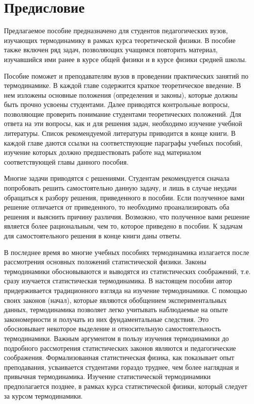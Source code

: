 
\chapter*{Предисловие}

Предлагаемое пособие предназначено для студентов педагогических вузов,
изучающих термодинамику в рамках курса теоретической физики. В пособие
также включен ряд задач, позволяющих учащимся повторить материал,
изучавшийся ими ранее в курсе общей физики и в курсе физики средней
школы.

Пособие поможет и преподавателям вузов в проведении практических занятий
по термодинамике. В каждой главе содержится краткое теоретическое
введение. В нем изложены основные положения (определения и законы),
которые должны быть прочно усвоены студентами. Далее приводятся
контрольные вопросы, позволяющие проверить понимание студентами
теоретических положений. Для ответа на эти вопросы, как и для решения
задач, необходимо изучение учебной литературы. Список рекомендуемой
литературы приводится в конце книги. В каждой главе даются ссылки на
соответствующие параграфы учебных пособий, изучение которых должно
предшествовать работе над материалом соответствующей главы данного
пособия.

Многие задачи приводятся с решениями. Студентам рекомендуется сначала
попробовать решить самостоятельно данную задачу, и лишь в случае неудачи
обращаться к разбору решения, приведенного в пособии. Если полученное
вами решение отличается от приведенного, то необходимо проанализировать
оба решения и выяснить причину различия. Возможно, что полученное вами
решение является более рациональным, чем то, которое приведено в
пособии. К задачам для самостоятельного решения в конце книги даны
ответы.

В последнее время во многие учебных пособиях термодинамика излагается
после рассмотрения основных положений статистической физики. Законы
термодинамики обосновываются и выводятся из статистических соображений,
т.е. сразу изучается статистическая термодинамика. В настоящем пособии
автор придерживается традиционного взгляда на изучение термодинамики. С
помощью своих законов (начал), которые являются обобщением
экспериментальных данных, термодинамика позволяет легко учитывать
наблюдаемые на опыте закономерности и получать из них фундаментальные
следствия. Это обосновывает некоторое выделение и относительную
самостоятельность термодинамики. Важным аргументом в пользу изучения
термодинамики до подробного рассмотрения статистических законов являются
и педагогические соображения. Формализованная статистическая физика, как
показывает опыт преподавания, усваивается студентами гораздо труднее,
чем более наглядная и привычная термодинамика. Изучение статистической
термодинамики предполагается позднее, в рамках курса статистической
физики, который следует за курсом термодинамики.
